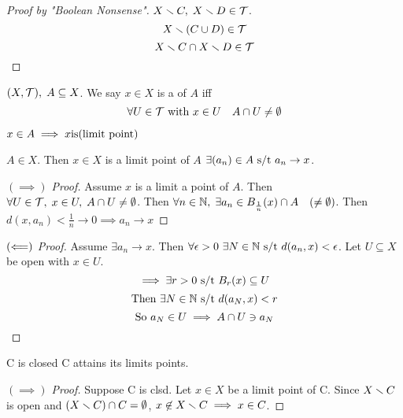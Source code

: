 \documentclass[12pt]{article}
\begin{document}
\bboxproof
\begin{proof}[Proof by "Boolean Nonsense"]
    \(X\smallsetminus C,\;X\smallsetminus D\in\mathcal T\).
    \[
        X\smallsetminus(C\cup D)\in\mathcal T
    \]
    \[
        X\smallsetminus C\cap X\smallsetminus D\in\mathcal T
    \]
\end{proof}
\ebox

\bboxdefn
\begin{defn}
    \((X,\mathcal T),\;A\subseteq X\).
    We say \(x\in X\) is a  of \(A\) iff
    \[
        \forall U\in\mathcal T\text{ with }x\in U\quad A\cap U\neq\emptyset
    \]
\end{defn}
\ebox

\bboxnote
\begin{note}
    \(x\in A\implies x\is\TM{limit\ point}\)
\end{note}
\ebox

\bboxprop
\begin{prop}
    \(A\in X\). Then \(x\in X\) is a limit point of \(A\) 
    \(\exists(a_n)\in A\text{ s/t } a_n\to x\).
\end{prop}
\ebox

\bboxproof
\begin{proof}[\((\implies)\) Proof]
    Assume \(x\) is a limit a point of \(A\). Then
    \(\forall U\in\mathcal T,\;x\in U,\;A\cap U\neq\emptyset\).
    Then \(\forall n\in\mathbb N,\;\exists a_n\in B_{\frac1n}(x)\cap A\quad(\neq\emptyset)\).
    Then \(d(x,a_n)<\frac1n\to0\implies a_n\to x\)
\end{proof}
\ebox

\bboxproof
\begin{proof}[\((\Longleftarrow)\) Proof]
    Assume \(\exists a_n\to x\). Then \(\forall\epsilon>0\ \exists N\in\mathbb N\text{ s/t } d(a_n,x)<\epsilon\).
    Let \(U\subseteq X\) be open with \(x\in U\).
    \[
        \implies\exists r>0\text{ s/t } B_r(x)\subseteq U
    \]
    \[
        \text{Then }\exists N\in\mathbb N\text{ s/t } d(a_N,x)<r
    \]
    \[
        \text{So }a_N\in U\implies A\cap U\ni a_N
    \]
\end{proof}
\ebox


\bboxprop
\begin{prop}
    C is closed 
    C attains its limits points.
\end{prop}
\ebox


\bboxproof
\begin{proof}[\((\implies)\) Proof]
    Suppose C is clsd.
    Let \(x\in X\) be a limit point of C.
    Since \(X\smallsetminus C\) is open
    and \((X\smallsetminus C)\cap C=\emptyset\),
    \(x\not\in X\smallsetminus C\implies x\in C\).
\end{proof}
\ebox
\end{document}
